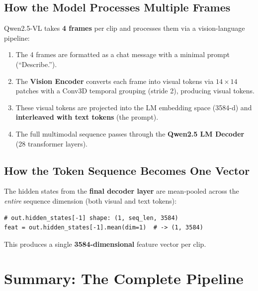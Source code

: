 \documentclass[a4paper, 12pt]{article}
\begin{document}
\subsection{How the Model Processes Multiple Frames}

Qwen2.5-VL takes \textbf{4 frames} per clip and processes them via a vision-language pipeline:

\begin{enumerate}
    \item The 4 frames are formatted as a chat message with a minimal prompt (``Describe.'').
    \item The \textbf{Vision Encoder} converts each frame into visual tokens via $14 \times 14$ patches with a Conv3D temporal grouping (stride 2), producing visual tokens.
    \item These visual tokens are projected into the LM embedding space (3584-d) and \textbf{interleaved with text tokens} (the prompt).
    \item The full multimodal sequence passes through the \textbf{Qwen2.5 LM Decoder} (28 transformer layers).
\end{enumerate}

\subsection{How the Token Sequence Becomes One Vector}

The hidden states from the \textbf{final decoder layer} are mean-pooled across the \emph{entire} sequence dimension (both visual and text tokens):

\begin{lstlisting}
# out.hidden_states[-1] shape: (1, seq_len, 3584)
feat = out.hidden_states[-1].mean(dim=1)  # -> (1, 3584)
\end{lstlisting}

This produces a single \textbf{3584-dimensional} feature vector per clip.

\section{Summary: The Complete Pipeline}
\end{document}
